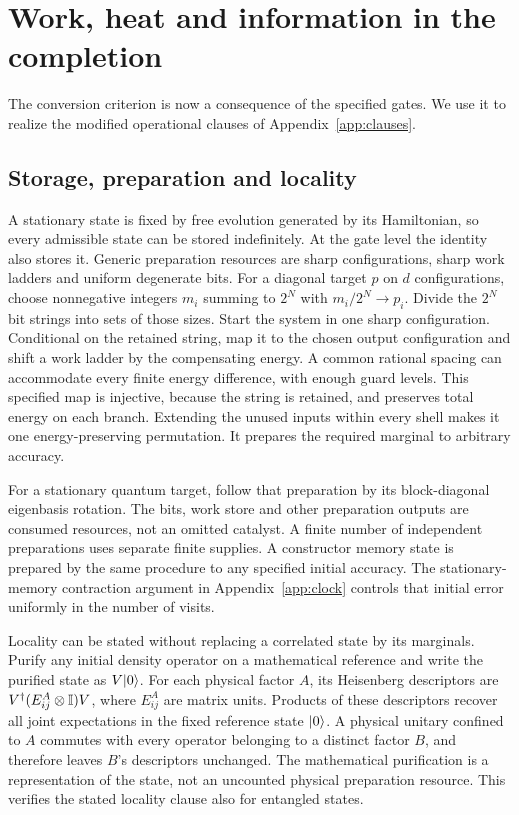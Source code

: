 \section{Work, heat and information in the completion}\label{app:media}
The conversion criterion is now a consequence of the specified gates. We use it to realize the modified operational clauses of Appendix~\ref{app:clauses}.

\subsection{Storage, preparation and locality}
A stationary state is fixed by free evolution generated by its Hamiltonian, so every admissible state can be stored indefinitely. At the gate level the identity also stores it. Generic preparation resources are sharp configurations, sharp work ladders and uniform degenerate bits. For a diagonal target $p$ on $d$ configurations, choose nonnegative integers $m_i$ summing to $2^N$ with $m_i/2^N\to p_i$. Divide the $2^N$ bit strings into sets of those sizes. Start the system in one sharp configuration. Conditional on the retained string, map it to the chosen output configuration and shift a work ladder by the compensating energy. A common rational spacing can accommodate every finite energy difference, with enough guard levels. This specified map is injective, because the string is retained, and preserves total energy on each branch. Extending the unused inputs within every shell makes it one energy-preserving permutation. It prepares the required marginal to arbitrary accuracy.

For a stationary quantum target, follow that preparation by its block-diagonal eigenbasis rotation. The bits, work store and other preparation outputs are consumed resources, not an omitted catalyst. A finite number of independent preparations uses separate finite supplies. A constructor memory state is prepared by the same procedure to any specified initial accuracy. The stationary-memory contraction argument in Appendix~\ref{app:clock} controls that initial error uniformly in the number of visits.

Locality can be stated without replacing a correlated state by its marginals. Purify any initial density operator on a mathematical reference and write the purified state as $V\lvert 0\rangle$. For each physical factor $A$, its Heisenberg descriptors are $V^\dagger(E^A_{ij}\otimes\mathbb{I})V$, where $E^A_{ij}$ are matrix units. Products of these descriptors recover all joint expectations in the fixed reference state $\lvert 0\rangle$. A physical unitary confined to $A$ commutes with every operator belonging to a distinct factor $B$, and therefore leaves $B$'s descriptors unchanged. The mathematical purification is a representation of the state, not an uncounted physical preparation resource. This verifies the stated locality clause also for entangled states.

